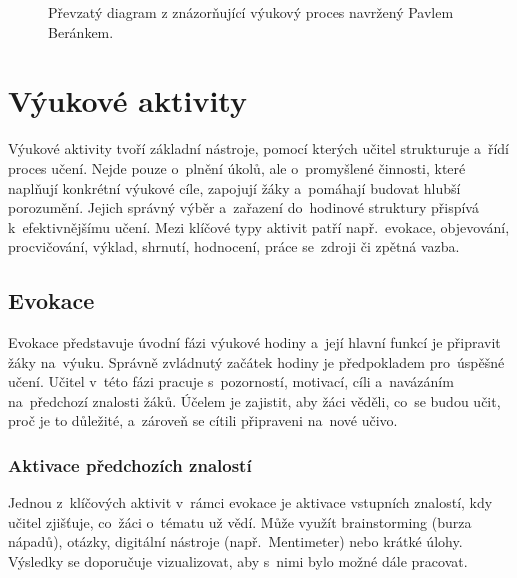 \documentclass[male,czech,api_bc]{kitheses}
\begin{document}
\begin{figure}[H]
	\centering
	\caption{Převzatý diagram z \cite{beranek2025} znázorňující výukový proces navržený Pavlem Beránkem.}
	\label{fig:vyukovy-proces}
\end{figure}

\section{Výukové aktivity}
Výukové aktivity tvoří základní nástroje, pomocí kterých učitel strukturuje a~řídí proces učení. Nejde pouze o~plnění úkolů, ale o~promyšlené činnosti, které naplňují konkrétní výukové cíle, zapojují žáky a~pomáhají budovat hlubší porozumění. Jejich správný výběr a~zařazení do~hodinové struktury přispívá k~efektivnějšímu učení. Mezi klíčové typy aktivit patří např.~evokace, objevování, procvičování, výklad, shrnutí, hodnocení, práce se~zdroji či zpětná vazba.

\subsection{Evokace}

Evokace představuje úvodní fázi výukové hodiny a~její hlavní funkcí je připravit žáky na~výuku. Správně zvládnutý začátek hodiny je předpokladem pro~úspěšné učení. Učitel v~této fázi pracuje s~pozorností, motivací, cíli a~navázáním na~předchozí znalosti žáků. Účelem je zajistit, aby žáci věděli, co~se budou učit, proč je to důležité, a~zároveň se cítili připraveni na~nové učivo.\cite{eduEvokace}

\subsubsection{Aktivace předchozích znalostí}
Jednou z~klíčových aktivit v~rámci evokace je aktivace vstupních znalostí, kdy učitel zjišťuje, co~žáci o~tématu už vědí. Může využít brainstorming (burza nápadů), otázky, digitální nástroje (např.~Mentimeter) nebo krátké úlohy. Výsledky se doporučuje vizualizovat, aby s~nimi bylo možné dále pracovat.\cite{eduAktivovaniVstupnichZnalosti}
\end{document}
